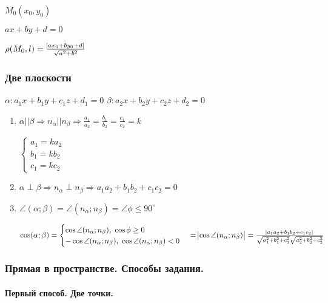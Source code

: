 \documentclass{article}
\begin{document}
    \( M_0(x_0, y_0) \)

    \( ax + by + d = 0 \)

    \( \rho(M_0, l) = \frac{\abs{ax_0 + by_0 + d}}{\sqrt{a^2 + b^2}} \)

    \subsubsection{Две плоскости}

    \( \alpha: a_1x + b_1y + c_1z + d_1 = 0 \)
    \( \beta: a_2x + b_2y + c_2z + d_2 = 0 \)

    \begin{enumerate}
        \item \( \alpha || \beta \Rightarrow n_\alpha || n_\beta \Rightarrow \frac{a_1}{a_2} = \frac{b_1}{b_2} = \frac{c_1}{c_2} = k \)
        
        \( \begin{cases}
            a_1 = ka_2\\
            b_1 = kb_2\\
            c_1 = kc_2
        \end{cases}\)

        \item \( \alpha \perp \beta \Rightarrow n_\alpha \perp n_\beta \Rightarrow a_1a_2 + b_1b_2 + c_1c_2 = 0 \)
        

        \item \( \angle(\alpha; \beta) = \angle(n_\alpha; n_\beta) = \angle \phi \leq 90^\circ  \)

        \(\cos(\alpha; \beta) = \begin{cases}
            \cos\angle(n_\alpha; n_\beta),\ \cos \phi \geq 0\\
            -\cos\angle(n_\alpha; n_\beta),\ \cos \angle(n_\alpha; n_\beta) < 0
        \end{cases} = \abs{\cos\angle(n_\alpha; n_\beta)} = \frac{\abs{a_1a_2 + b_1b_2 + c_1c_2}}{\sqrt{a_1^2 + b_1^2 + c_1^2}\sqrt{a_2^2 + b_2^2 + c_2^2}} \)
    \end{enumerate}

    \subsubsection{Прямая в пространстве. Способы задания.} 

    \paragraph*{Первый способ. Две точки.}\mbox{}\\
    
\end{document}
